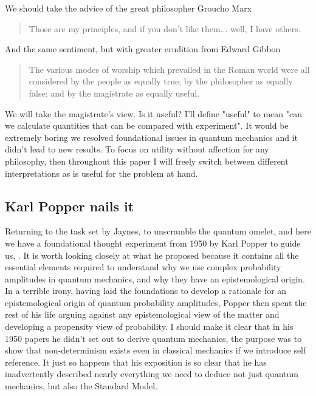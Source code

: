 We should take the advice of the great philosopher Groucho Marx~\autocite{marx_1933}
\begin{quotation}
Those are my principles, and if you don't like them... well, I have others.
\end{quotation}
And the same sentiment, but with greater erudition from Edward Gibbon~\autocite{gibbon_1776}
\begin{quotation}
The various modes of worship which prevailed in the Roman world were all considered by the
people as equally true; by the philosopher as equally false; and by the magistrate as equally
useful.
\end{quotation}
We will take the magistrate's view. Is it useful? I'll define "useful" to mean "can we calculate
quantities that can be compared with experiment". It would be extremely boring we resolved
foundational issues in quantum mechanics and it didn't lead to new results. To focus on utility
without affection for any philosophy, then throughout this paper I will freely switch between
different interpretations as is useful for the problem at hand.

\subsection{Karl Popper nails it}
\label{sec:popper}
Returning to the task set by Jaynes, to unscramble the quantum omelet, and here we have a
foundational thought experiment from 1950 by Karl Popper to guide us,
\autocite{Popper1950a, Popper1950b}. It is worth looking closely at what he proposed because it
contains all the essential elements required to understand why we use complex probability
amplitudes in quantum mechanics, and why they have an epistemological origin. In a terrible
irony, having laid the foundations to develop a rationale for an epistemological origin of
quantum probability amplitudes, Popper then spent the rest of his life arguing against any
epistemological view of the matter and developing a propensity view of probability. I
should make it clear that in his 1950 papers he didn't set out to derive quantum mechanics, the
purpose was to show that non-determinism exists even in classical mechanics if we introduce self
reference. It just so happens that his exposition is so clear that he has inadvertently
described nearly everything we need to deduce not just quantum mechanics, but also the Standard
Model.

